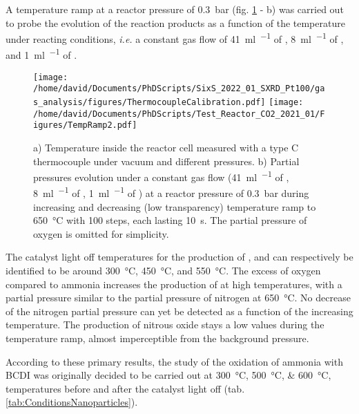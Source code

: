A temperature ramp at a reactor pressure of \qty{0.3}{\bar} (fig. \ref{fig:TempRamps} - b) was carried out to probe the evolution of the reaction products as a function of the temperature under reacting conditions, \textit{i.e.} a constant gas flow of \qty{41}{\ml\per\min} of , \qty{8}{\ml\per\min} of , and \qty{1}{\ml\per\min} of .

\begin{figure}[!htb]
    \centering
    \texttt{[image: /home/david/Documents/PhDScripts/SixS\_2022\_01\_SXRD\_Pt100/gas\_analysis/figures/ThermocoupleCalibration.pdf]}
    \texttt{[image: /home/david/Documents/PhDScripts/Test\_Reactor\_CO2\_2021\_01/Figures/TempRamp2.pdf]}
    \caption{
        a) Temperature inside the reactor cell measured with a type C thermocouple under vacuum and different  pressures.
        b) Partial pressures evolution under a constant gas flow (\qty{41}{\ml\per\min} of , \qty{8}{\ml\per\min} of , \qty{1}{\ml\per\min} of ) at a reactor pressure of \qty{0.3}{\bar} during increasing and decreasing (low transparency) temperature ramp to \qty{650}{\degreeCelsius} with 100 steps, each lasting \qty{10}{\second}.
        The partial pressure of oxygen is omitted for simplicity.
    }
    \label{fig:TempRamps}
\end{figure}

The catalyst light off temperatures for the production of ,  and  can respectively be identified to be around \qty{300}{\degreeCelsius}, \qty{450}{\degreeCelsius}, and \qty{550}{\degreeCelsius}.
The excess of oxygen compared to ammonia increases the production of  at high temperatures, with a partial pressure similar to the partial pressure of nitrogen at \qty{650}{\degreeCelsius}.
No decrease of the nitrogen partial pressure can yet be detected as a function of the increasing temperature.
The production of nitrous oxide stays a low values during the temperature ramp, almost imperceptible from the background pressure.

According to these primary results, the study of the oxidation of ammonia with BCDI was originally decided to be carried out at \qtylist{300;500;600}{\degreeCelsius}, temperatures before and after the catalyst light off (tab. \ref{tab:ConditionsNanoparticles}).

